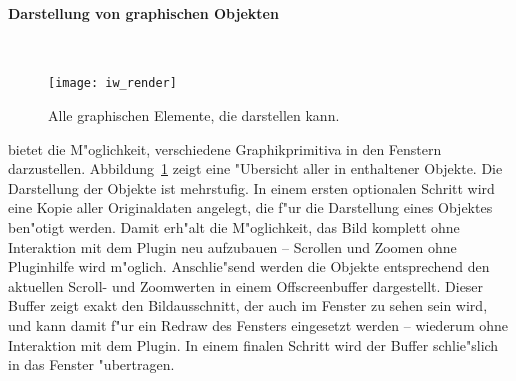 \paragraph{Darstellung von graphischen Objekten}\hfill\\

\begin{figure}[htb]
  \begin{center}
    \texttt{[image: iw\_render]}
  \end{center}
  \caption[Die graphischen Elemente von \icewing{}]
  {Alle graphischen Elemente, die \icewing{} darstellen kann.}
  \label{fig:p_render}
\end{figure}

\icewing{} bietet die M"oglichkeit, verschiedene Graphikprimitiva in
den Fenstern darzustellen. Abbildung~\ref{fig:p_render} zeigt eine
"Ubersicht aller in \icewing{} enthaltener Objekte. Die Darstellung
der Objekte ist mehrstufig. In einem ersten optionalen Schritt wird
eine Kopie aller Originaldaten angelegt, die f"ur die Darstellung
eines Objektes ben"otigt werden. Damit erh"alt \icewing{} die
M"oglichkeit, das Bild komplett ohne Interaktion mit dem Plugin neu
aufzubauen -- Scrollen und Zoomen ohne Pluginhilfe wird m"oglich.
Anschlie"send werden die Objekte entsprechend den aktuellen Scroll-
und Zoomwerten in einem Offscreenbuffer dargestellt. Dieser Buffer
zeigt exakt den Bildausschnitt, der auch im Fenster zu sehen sein
wird, und kann damit f"ur ein Redraw des Fensters eingesetzt
werden -- wiederum ohne Interaktion mit dem Plugin. In einem finalen
Schritt wird der Buffer schlie"slich in das Fenster "ubertragen.

